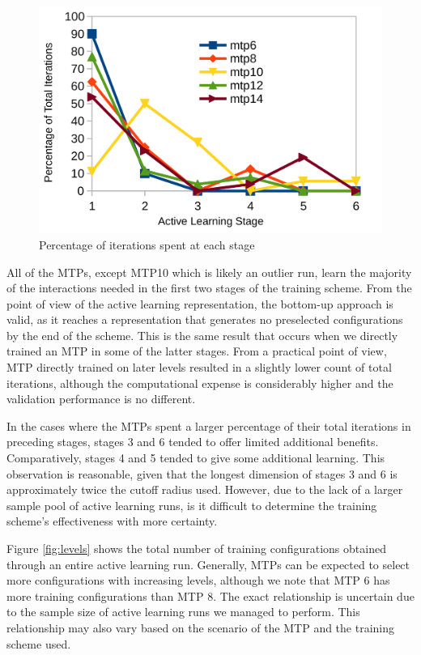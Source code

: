 \documentclass[9pt,twocolumn,twoside]{opticajnl}
\begin{document}
\begin{figure}[ht]
  \centering
  \includegraphics[width=\linewidth]{assets/iterations.png}
  \caption{Percentage of iterations spent at each stage}
  \label{fig:iterations}
\end{figure}

All of the MTPs, except MTP10 which is likely an outlier run, learn the majority of the interactions needed in the first two stages of the training scheme. From the point of view of the active learning representation, the bottom-up approach is valid, as it reaches a representation that generates no preselected configurations by the end of the scheme. This is the same result that occurs when we directly trained an MTP in some of the latter stages. From a practical point of view, MTP directly trained on later levels resulted in a slightly lower count of total iterations, although the computational expense is considerably higher and the validation performance is no different. 

In the cases where the MTPs spent a larger percentage of their total iterations in preceding stages, stages 3 and 6 tended to offer limited additional benefits. Comparatively, stages 4 and 5 tended to give some additional learning. This observation is reasonable, given that the longest dimension of stages 3 and 6 is approximately twice the cutoff radius used. However, due to the lack of a larger sample pool of active learning runs, is it difficult to determine the training scheme's effectiveness with more certainty. 

Figure \ref{fig:levels} shows the total number of training configurations obtained through an entire active learning run. Generally, MTPs can be expected to select more configurations with increasing levels, although we note that MTP 6 has more training configurations than MTP 8. The exact relationship is uncertain due to the sample size of active learning runs we managed to perform. This relationship may also vary based on the scenario of the MTP and the training scheme used. 
\end{document}
